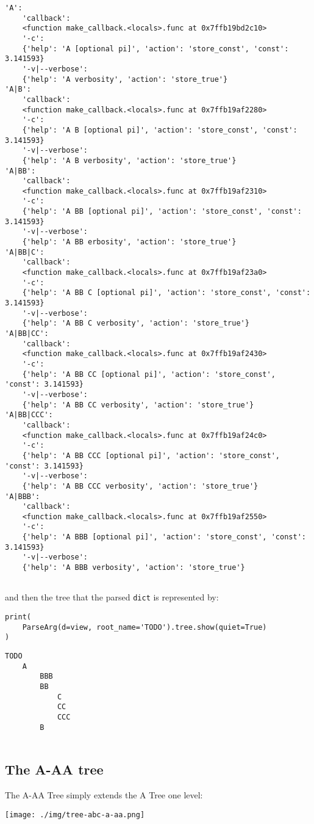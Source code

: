 \documentclass[10pt]{amsart}
\numberwithin{equation}{section}
\begin{document}
\begin{verbatim}
'A':
    'callback':
    <function make_callback.<locals>.func at 0x7ffb19bd2c10>
    '-c':
    {'help': 'A [optional pi]', 'action': 'store_const', 'const': 3.141593}
    '-v|--verbose':
    {'help': 'A verbosity', 'action': 'store_true'}
'A|B':
    'callback':
    <function make_callback.<locals>.func at 0x7ffb19af2280>
    '-c':
    {'help': 'A B [optional pi]', 'action': 'store_const', 'const': 3.141593}
    '-v|--verbose':
    {'help': 'A B verbosity', 'action': 'store_true'}
'A|BB':
    'callback':
    <function make_callback.<locals>.func at 0x7ffb19af2310>
    '-c':
    {'help': 'A BB [optional pi]', 'action': 'store_const', 'const': 3.141593}
    '-v|--verbose':
    {'help': 'A BB erbosity', 'action': 'store_true'}
'A|BB|C':
    'callback':
    <function make_callback.<locals>.func at 0x7ffb19af23a0>
    '-c':
    {'help': 'A BB C [optional pi]', 'action': 'store_const', 'const': 3.141593}
    '-v|--verbose':
    {'help': 'A BB C verbosity', 'action': 'store_true'}
'A|BB|CC':
    'callback':
    <function make_callback.<locals>.func at 0x7ffb19af2430>
    '-c':
    {'help': 'A BB CC [optional pi]', 'action': 'store_const', 'const': 3.141593}
    '-v|--verbose':
    {'help': 'A BB CC verbosity', 'action': 'store_true'}
'A|BB|CCC':
    'callback':
    <function make_callback.<locals>.func at 0x7ffb19af24c0>
    '-c':
    {'help': 'A BB CCC [optional pi]', 'action': 'store_const', 'const': 3.141593}
    '-v|--verbose':
    {'help': 'A BB CCC verbosity', 'action': 'store_true'}
'A|BBB':
    'callback':
    <function make_callback.<locals>.func at 0x7ffb19af2550>
    '-c':
    {'help': 'A BBB [optional pi]', 'action': 'store_const', 'const': 3.141593}
    '-v|--verbose':
    {'help': 'A BBB verbosity', 'action': 'store_true'}


\end{verbatim}
and then the tree that the parsed \texttt{dict} is represented by:
\begin{verbatim}
print(
    ParseArg(d=view, root_name='TODO').tree.show(quiet=True)
)
\end{verbatim}

\begin{verbatim}
TODO
    A
        BBB
        BB
            C
            CC
            CCC
        B


\end{verbatim}

\newpage
\subsection{The A-AA tree}
\label{sec:org3a64106}
The A-AA Tree simply extends the A Tree one level:
\begin{center}
\texttt{[image: ./img/tree-abc-a-aa.png]}
\end{center}
\end{document}
